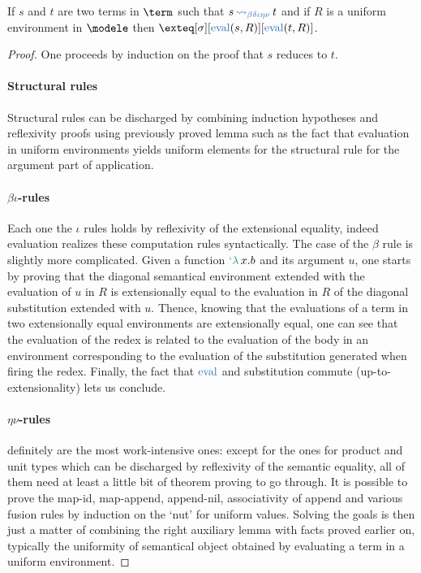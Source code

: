 \documentclass[preprint]{sigplanconf}
\begin{document}
\begin{theorem}If $s$ and $t$ are two terms in $\term$ such that $s \reduce t$
and if $R$ is a uniform environment in $\modele$ then
$\exteq[\sigma][\termeval(s , R)][\termeval(t , R)]$.
\end{theorem}
\begin{proof}One proceeds by induction on the proof that $s$ reduces to $t$.
\paragraph{Structural rules} Structural rules can be discharged by combining
induction hypotheses and reflexivity proofs using previously proved lemma such
as the fact that evaluation in uniform environments yields uniform elements
for the structural rule for the argument part of application.

\paragraph{$\beta\iota$-rules} Each one the $\iota$ rules holds by reflexivity
of the extensional equality, indeed evaluation realizes these computation rules
syntactically. The case of the $\beta$ rule is slightly more complicated.
Given a function $\telam x. b$ and its argument $u$, one starts by proving
that the diagonal semantical environment extended with the evaluation of $u$
in $R$ is extensionally equal to the evaluation in $R$ of the diagonal
substitution extended with $u$. Thence, knowing that the evaluations of a term
in two extensionally equal environments are extensionally equal, one can see
that the evaluation of the redex is related to the evaluation of the body in
an environment corresponding to the evaluation of the substitution generated
when firing the redex. Finally, the fact that $\termeval$ and substitution
commute (up-to-extensionality) lets us conclude.

\paragraph{$\eta\nu$-rules} definitely are the most work-intensive ones: except
for the ones for product and unit types which can be discharged by reflexivity
of the semantic equality, all of them need at least a little bit of theorem
proving to go through. It is possible to prove the map-id, map-append,
append-nil, associativity of append and various fusion rules by induction on
the `nut' for uniform values. Solving the goals is then just a matter of
combining the right auxiliary lemma with facts proved earlier on, typically
the uniformity of semantical object obtained by evaluating a term in a uniform
environment.
\end{proof}
\end{document}
